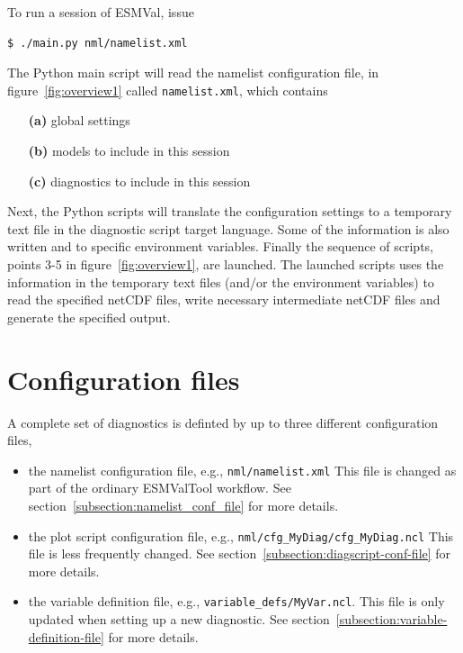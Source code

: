 \documentclass[12pt]{article}
\begin{document}
To run a session of ESMVal, issue 
\begin{Verbatim}[frame=single, fontsize=\footnotesize]
$ ./main.py nml/namelist.xml
\end{Verbatim}
The Python main script will read the namelist configuration file, in
figure~\ref{fig:overview1} called \texttt{namelist.xml}, which
contains 
\begin{itemize}
\item[\textbf{(a)}] global settings
\item[\textbf{(b)}] models to include in this session
\item[\textbf{(c)}] diagnostics to include in this session
\end{itemize}

Next, the Python scripts will translate the configuration settings to
a temporary text file in the diagnostic script target language. Some
of the information is also written and to specific environment
variables. Finally the sequence of scripts, points 3-5 in
figure~\ref{fig:overview1}, are launched. The launched scripts uses
the information in the temporary text files (and/or the environment
variables) to read the specified netCDF files, write necessary
intermediate netCDF files and generate the specified output.




% 
% 
\section{Configuration files}\label{section:config-files}
A complete set of diagnostics is definted by up to three different
configuration files, 
\begin{itemize}
\item the namelist configuration file, e.g., \texttt{nml/namelist.xml}
This file is changed as part of the ordinary ESMValTool workflow. See
section~\ref{subsection:namelist_conf_file} for more details.

\item the plot script configuration file, e.g.,
\texttt{nml/cfg\_MyDiag/cfg\_MyDiag.ncl} This file is less frequently
changed. See section~\ref{subsection:diagscript-conf-file} for more
details.

\item the variable definition file, e.g.,
\texttt{variable\_defs/MyVar.ncl}. This file is only updated when
setting up a new diagnostic. See
section~\ref{subsection:variable-definition-file} for more details.

\end{itemize}
\end{document}
